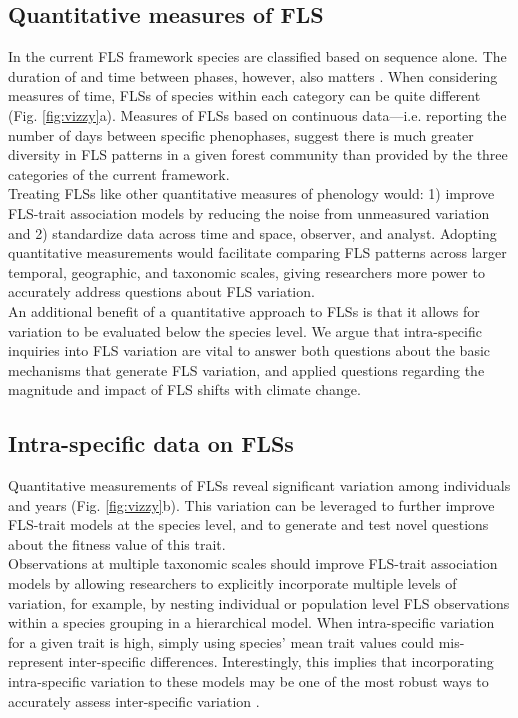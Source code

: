 \documentclass[11pt]{article}
\begin{document}
\subsection*{Quantitative measures of FLS}
\noindent In the current FLS framework species are classified based on sequence alone. The duration of and time between phases, however, also matters \citep{Inouye2019}. When considering measures of time, FLSs of species within each category can be quite different (Fig. \ref{fig:vizzy}a). Measures of FLSs based on continuous data---i.e. reporting the number of days between specific phenophases, suggest there is much greater diversity in FLS patterns in a given forest community than provided by the three categories of the current framework.\\ 

\noindent Treating FLSs like other quantitative measures of phenology \citep[e.g. the BBCH scale,][]{Finn2007} would: 1) improve FLS-trait association models by reducing the noise from unmeasured variation and 2) standardize data across time and space, observer, and analyst. Adopting quantitative measurements would facilitate comparing FLS patterns across larger temporal, geographic, and taxonomic scales, giving researchers more power to accurately address questions about FLS variation.\\

\noindent An additional benefit of a quantitative approach to FLSs is that it allows for variation to be evaluated below the species level. We argue that intra-specific inquiries into FLS variation are vital to answer both questions about the basic mechanisms that generate FLS variation, and applied questions regarding the magnitude and impact of FLS shifts with climate change.

\subsection*{Intra-specific data on FLSs}

\noindent Quantitative measurements of FLSs reveal significant variation among individuals and years (Fig. \ref{fig:vizzy}b). This variation can be leveraged to further improve FLS-trait models at the species level, and to generate and test novel questions about the fitness value of this trait.\\

\noindent Observations at multiple taxonomic scales should improve FLS-trait association models by allowing researchers to explicitly incorporate multiple levels of variation, for example, by nesting individual or population level FLS observations within a species grouping in a hierarchical model. When intra-specific variation for a given trait is high, simply using species' mean trait values could mis-represent inter-specific differences. Interestingly, this implies that incorporating intra-specific variation to these models may be one of the most robust ways to accurately assess inter-specific variation \citep{Smith2019}.\\  
\end{document}
